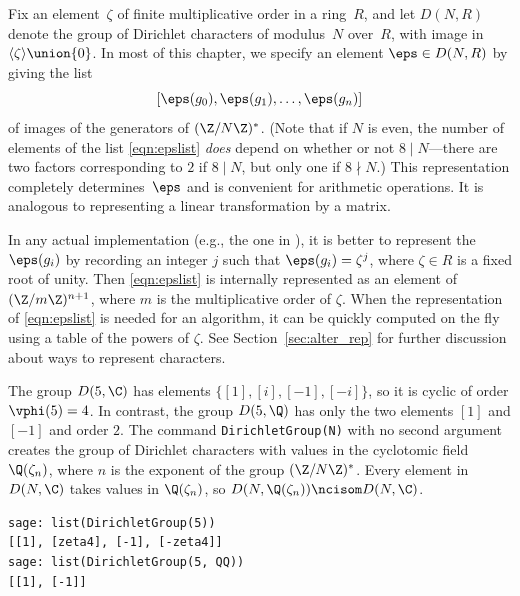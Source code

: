 Fix an element~$\zeta$ of finite multiplicative order in a ring~$R$,
and let $D(N,R)$ denote the group of Dirichlet characters of modulus~$N$
over~$R$, with image in $\langle \zeta\rangle \union \{0\}$. 
In most of this chapter, we
specify an element $\eps\in D(N,R)$ by giving the list
\begin{equation}\label{eqn:epslist}
[\eps(g_0), \eps(g_1), \ldots, \eps(g_n)]
\end{equation}
of images of the generators of $(\Z/N\Z)^*$.  (Note that if $N$ is
even, the number of elements of the list \eqref{eqn:epslist} {\em
  does} depend on whether or not $8\mid N$---there are two factors
corresponding to $2$ if $8\mid N$, but only one if $8\nmid N$.)  This
representation completely determines~$\eps$ and is convenient for
arithmetic operations.  It is analogous to representing a linear
transformation by a matrix. 
\begin{remark}
In any actual implementation (e.g., the one in \sage), it
is better to represent the $\eps(g_i)$ by recording an integer
$j$ such that $\eps(g_i) = \zeta^j$, where $\zeta \in R$
is a fixed root of unity.  Then \eqref{eqn:epslist} is
internally represented as an element of $(\Z/m\Z)^{n+1}$, where
$m$ is the multiplicative order of $\zeta$.  When
the representation of \eqref{eqn:epslist} is needed for an algorithm,
it can be quickly computed on the fly using a table of the powers
of $\zeta$.
 See Section~\ref{sec:alter_rep} for further discussion about
 ways to represent characters.
\end{remark}

\begin{example}
The group $D(5,\C)$ has elements 
$\{[1], [i], [-1], [-i]\}$,
so it is cyclic of order $\vphi(5)=4$.
In contrast,  the group $D(5,\Q)$ has only the
two elements $[1]$ and $[-1]$ and order $2$.
The command {\tt DirichletGroup(N)}
with no second argument creates the group of
Dirichlet characters with values in the
cyclotomic field $\Q(\zeta_n)$, where $n$
is the exponent of the group $(\Z/N\Z)^*$.
Every element in $D(N,\C)$ takes values
in $\Q(\zeta_n)$, so $D(N,\Q(\zeta_n)) \ncisom D(N,\C)$.
\begin{verbatim}
sage: list(DirichletGroup(5))
[[1], [zeta4], [-1], [-zeta4]]
sage: list(DirichletGroup(5, QQ))
[[1], [-1]]
\end{verbatim}
\end{example}

